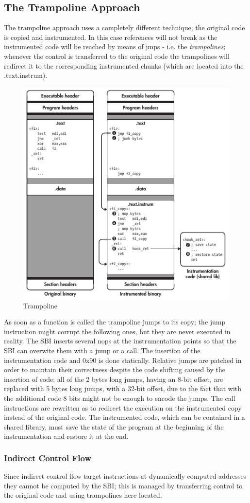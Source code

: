 \subsection{The Trampoline Approach}
The trampoline approach uses a completely different technique; the original code is copied and instrumented. In this
case references will not break as the instrumented code will be reached by means of  {\ttfamily jmp}s - i.e. the
\textit{trampolines}; whenever the control is transferred to the original code the trampolines will redirect it to the
corresponding instrumented chunks (which are located into the {\ttfamily .text.instrum}).
\begin{figure}[bpth]
    \begin{center}
        \includegraphics[scale=0.7]{./pics/trampoline.png}
        \caption{Trampoline}
        \label{trampoline}
    \end{center}
\end{figure}
As soon as a function is called the trampoline jumps to its copy; the jump instruction might corrupt the following ones,
but they are never executed in reality. The SBI inserts several {\ttfamily nop}s at the instrumentation points so that
the SBI can overwite them with a jump or a call. The insertion of the instrumentation code and {\ttfamily 0x90} is done
statically. Relative jumps are patched in order to maintain their correctness despite the code shifting caused by the
insertion of code; all of the 2 bytes long jumps, having an 8-bit offset, are replaced with 5 bytes long jumps, with a
32-bit offset, due to the fact that with the additional code 8 bits might not be enough to encode the jumps. The
{\ttfamily call} instructions are rewritten as to redirect the execution on the instrumented copy instead of the
original code. The instrumented code, which can be contained in a shared library, must save the state of the program at
the beginning of the instrumentation and restore it at the end.

\subsubsection{Indirect Control Flow}
Since indirect control flow target instructions at dynamically computed addresses they cannot be computed by the SBI;
this is managed by transferring control to the original code and using trampolines here located.

